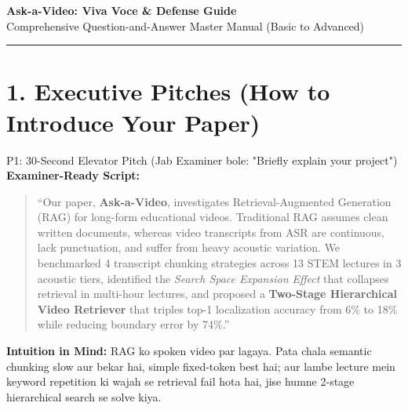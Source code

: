 \documentclass[10pt,a4paper]{article}
\begin{document}
\begin{center}
    {\huge\bfseries\color{primary} Ask-a-Video: Viva Voce \& Defense Guide}\\[4pt]
    {\large\color{secondary} Comprehensive Question-and-Answer Master Manual (Basic to Advanced)}\\[6pt]
    \rule{\textwidth}{1.2pt}
\end{center}

\vspace{-4pt}

\section*{\color{primary} 1. Executive Pitches (How to Introduce Your Paper)}

\begin{quesbox}{P1: 30-Second Elevator Pitch (Jab Examiner bole: "Briefly explain your project")}
\textbf{Examiner-Ready Script:}
\begin{quote}
``Our paper, \textbf{Ask-a-Video}, investigates Retrieval-Augmented Generation (RAG) for long-form educational videos. Traditional RAG assumes clean written documents, whereas video transcripts from ASR are continuous, lack punctuation, and suffer from heavy acoustic variation. We benchmarked 4 transcript chunking strategies across 13 STEM lectures in 3 acoustic tiers, identified the \textit{Search Space Expansion Effect} that collapses retrieval in multi-hour lectures, and proposed a \textbf{Two-Stage Hierarchical Video Retriever} that triples top-1 localization accuracy from 6\% to 18\% while reducing boundary error by 74\%.''
\end{quote}
\textbf{Intuition in Mind:} RAG ko spoken video par lagaya. Pata chala semantic chunking slow aur bekar hai, simple fixed-token best hai; aur lambe lecture mein keyword repetition ki wajah se retrieval fail hota hai, jise humne 2-stage hierarchical search se solve kiya.
\end{quesbox}
\end{document}
